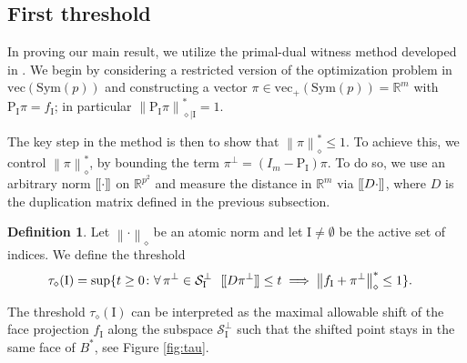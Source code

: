\documentclass[12pt]{amsart}
\numberwithin{equation}{section}
\numberwithin{equation}{section}
\theoremstyle{definition}
\newtheorem{defin}[thm]{Definition}
\newcommand{\R}{\mathbb{R}}
\newcommand{\I}{\mathrm{I}}
\newcommand{\poly}[1]{\left\|#1\right\|_\diamond}
\newcommand{\polyd}[1]{\left\|#1\right\|^\ast_\diamond}
\newcommand{\polydr}[2]{\left\|#1\right\|^\ast_{\diamond\mid #2}}
\newcommand{\PP}{\mathrm{P}}
\renewcommand{\SS}{\mathcal{S}}
\newcommand{\cnorm}[1]{[\mkern-1.5mu[#1]\mkern-1.5mu]}
\renewcommand{\v}[1]{\mathrm{vec}(#1)}
\newcommand{\vp}[1]{\mathrm{vec_+}(#1)}
\begin{document}
\subsection{First threshold}\label{sec:tau}
In proving our main result, we utilize the primal-dual witness method developed in \cite{wain09,ravikumar2011graphical}. We begin by considering a restricted version of the optimization problem in $\v{\mathrm{Sym}(p)}$ and constructing a vector $\pi\in\vp{\mathrm{Sym}(p)}=\R^m$ with $\PP_\I \pi = f_\I$; in particular $\polydr{\PP_{\I}\pi}{\I}=1$.



The key step in the method is then to show that $\polyd{\pi}\leq 1$. To achieve this, we control $\polyd{\pi}$, by bounding the term $\pi^\bot=(I_m-\PP_{\I})\pi$. 
To do so, we use an arbitrary norm $\cnorm{\cdot}$ on $\R^{p^2}$ and measure the distance in $\R^m$ via  $\cnorm{D\cdot}$, where $D$ is the duplication matrix defined in the previous subsection.


\begin{defin}\label{def:tau}
Let $\poly{\cdot}$ be an atomic norm and let $\I\neq\emptyset$ be the active set of indices. We define the threshold 
\begin{align*}
\tau_\diamond(\I)& =
\sup\{t\geq0\colon \forall\,\pi^\bot\in\SS_{\I}^\bot\,\,\,\, \cnorm{D\pi^\bot}\leq t\implies \polyd{f_{\I}+\pi^\bot}\leq 1\}.
\end{align*}
\end{defin}




The threshold \(\tau_\diamond(\I)\) can be interpreted as the maximal allowable shift of the face projection $f_\I$ along the subspace \(\SS_{\I}^\perp\) such that the shifted point stays in the same face of $B^\ast$, see Figure \ref{fig:tau}.
\end{document}
